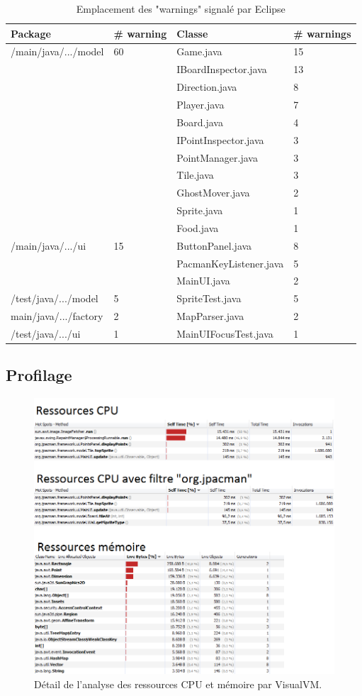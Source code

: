 \documentclass[12pt,a4paper,final]{article}
\begin{document}
\begin{table}[!h]
\begin{tabular}{|l|l|l|l|}
\hline
Package & \# warning & Classe & \# warnings \\
\hline
/main/java/.../model & 60 & Game.java & 15 \\
&& IBoardInspector.java & 13 \\
&& Direction.java & 8 \\
&& Player.java & 7 \\
&& Board.java & 4 \\
&& IPointInspector.java & 3 \\
&& PointManager.java & 3 \\
&& Tile.java & 3 \\
&& GhostMover.java & 2 \\
&& Sprite.java & 1 \\
&& Food.java & 1 \\
\hline
/main/java/.../ui & 15 & ButtonPanel.java & 8 \\
&& PacmanKeyListener.java & 5 \\
&& MainUI.java & 2 \\
\hline
/test/java/.../model & 5 & SpriteTest.java & 5 \\
\hline
main/java/.../factory & 2 & MapParser.java & 2 \\
\hline
/test/java/.../ui & 1 & MainUIFocusTest.java & 1 \\
\hline
\end{tabular}
\caption{Emplacement des "warnings" signalé par Eclipse}
\label{warnings}
\end{table}

\subsection{Profilage}
\begin{figure}[!h]
	\centering
	\includegraphics[width=\textwidth]{Profilage.png}
	\caption{\label{profilage}Détail de l'analyse des ressources CPU et mémoire par VisualVM.}
\end{figure}
\end{document}
